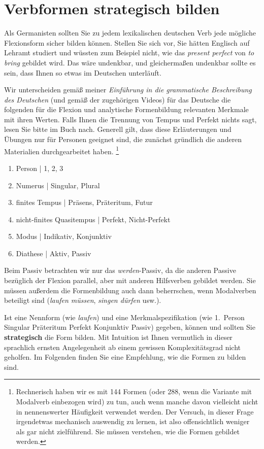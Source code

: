 \section{Verbformen strategisch bilden}

Als Germanisten sollten Sie zu jedem lexikalischen deutschen Verb jede mögliche Flexionsform sicher bilden können.
Stellen Sie sich vor, Sie hätten Englisch auf Lehramt studiert und wüssten zum Beispiel nicht, wie das \textit{present perfect} von \textit{to bring} gebildet wird.
Das wäre undenkbar, und gleichermaßen undenkbar sollte es sein, dass Ihnen so etwas im Deutschen unterläuft.

Wir unterscheiden gemäß meiner \textit{Einführung in die grammatische Beschreibung des Deutschen} (und gemäß der zugehörigen Videos) für das Deutsche die folgenden für die Flexion und analytische Formenbildung relevanten Merkmale mit ihren Werten.
Falls Ihnen die Trennung von Tempus und Perfekt nichts sagt, lesen Sie bitte im Buch nach.
Generell gilt, dass diese Erläuterungen und Übungen nur für Personen geeignet sind, die zunächst gründlich die anderen Materialien durchgearbeitet haben.%
\footnote{Rechnerisch haben wir es mit 144 Formen (oder 288, wenn die Variante mit Modalverb einbezogen wird) zu tun, auch wenn manche davon vielleicht nicht in nennenswerter Häufigkeit verwendet werden.
Der Versuch, in dieser Frage irgendetwas mechanisch auswendig zu lernen, ist also offensichtlich weniger als gar nicht zielführend.
Sie müssen verstehen, wie die Formen gebildet werden.}

\begin{enumerate}\Lf
  \item Person | 1, 2, 3
  \item Numerus | Singular, Plural
  \item finites Tempus | Präsens, Präteritum, Futur
  \item nicht-finites Quasitempus | Perfekt, Nicht-Perfekt
  \item Modus | Indikativ, Konjunktiv
  \item Diathese | Aktiv, Passiv
\end{enumerate}

Beim Passiv betrachten wir nur das \textit{werden}-Passiv, da die anderen Passive bezüglich der Flexion parallel, aber mit anderen Hilfsverben gebildet werden.
Sie müssen außerdem die Formenbildung auch dann beherrschen, wenn Modalverben beteiligt sind (\textit{laufen müssen}, \textit{singen dürfen} usw.).

Ist eine Nennform (wie \textit{laufen}) und eine Merkmalspezifikation (wie 1.~Person Singular Präteritum Perfekt Konjunktiv Passiv) gegeben, können und sollten Sie \textbf{strategisch} die Form bilden.
Mit Intuition ist Ihnen vermutlich in dieser sprachlich ernsten Angelegenheit ab einem gewissen Komplexitätsgrad nicht geholfen.
Im Folgenden finden Sie eine Empfehlung, wie die Formen zu bilden sind.

